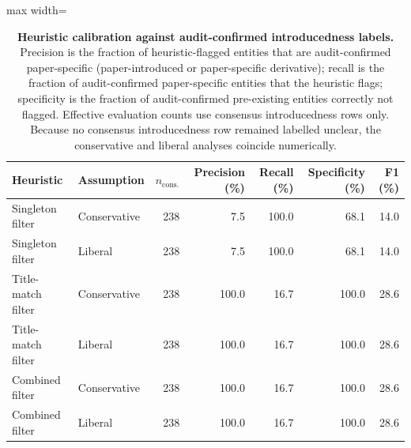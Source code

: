 \begin{table}[H]
\centering
\caption{\textbf{Heuristic calibration against audit-confirmed introducedness labels.} Precision is the fraction of heuristic-flagged entities that are audit-confirmed paper-specific (paper-introduced or paper-specific derivative); recall is the fraction of audit-confirmed paper-specific entities that the heuristic flags; specificity is the fraction of audit-confirmed pre-existing entities correctly not flagged. Effective evaluation counts use consensus introducedness rows only. Because no consensus introducedness row remained labelled unclear, the conservative and liberal analyses coincide numerically.}
\label{tab:annotation_heuristic_calibration}
\begin{adjustbox}{max width=\textwidth}
\begin{tabular}{l l r rrrr}
\toprule
Heuristic & Assumption & $n_{\mathrm{cons.}}$ & Precision (\%) & Recall (\%) & Specificity (\%) & F1 (\%) \\
\midrule
Singleton filter & Conservative & 238 & 7.5 & 100.0 & 68.1 & 14.0 \\
Singleton filter & Liberal & 238 & 7.5 & 100.0 & 68.1 & 14.0 \\
\addlinespace
Title-match filter & Conservative & 238 & 100.0 & 16.7 & 100.0 & 28.6 \\
Title-match filter & Liberal & 238 & 100.0 & 16.7 & 100.0 & 28.6 \\
\addlinespace
Combined filter & Conservative & 238 & 100.0 & 16.7 & 100.0 & 28.6 \\
Combined filter & Liberal & 238 & 100.0 & 16.7 & 100.0 & 28.6 \\
\bottomrule
\end{tabular}
\end{adjustbox}
\end{table}

